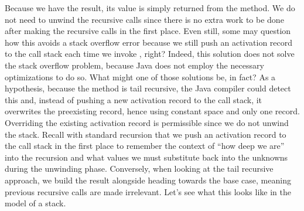Because we have the result, its value is simply returned from the method. We do not need to unwind the recursive calls since there is no extra work to be done after making the recursive calls in the first place. Even still, some may question how this avoids a stack overflow error because we still push an activation record to the call stack each time we invoke , right? Indeed, this solution does not solve the stack overflow problem, because Java does not employ the necessary optimizations to do so. What might one of those solutions be, in fact? As a hypothesis, because the method is tail recursive, the Java compiler could detect this and, instead of pushing a new activation record to the call stack, it overwrites the preexisting record, hence using constant space and only one record. Overriding the existing activation record is permissible since we do not unwind the stack. Recall with standard recursion that we push an activation record to the call stack in the first place to remember the context of ``how deep we are'' into the recursion and what values we must substitute back into the unknowns during the unwinding phase. Conversely, when looking at the tail recursive approach, we build the result alongside heading towards the base case, meaning previous recursive calls are made irrelevant. Let's see what this looks like in the model of a stack.
